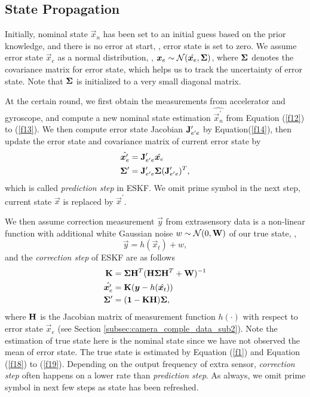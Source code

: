 \subsection{State Propagation}
\label{subsec:ESKF_IMU_sub4}

Initially, nominal state $\vec{x}_n$ has been set to an initial guess based on the prior knowledge, and there is no error at start, \ie, error state is set to zero. We assume error state $\vec{x}_e$ as a normal distribution, \ie, $\boldsymbol{x}_e \sim \mathcal{N}(\hat{\boldsymbol{x}_e}, \mathbf{\Sigma})$, where $\mathbf{\Sigma}$ denotes the covariance matrix for error state, which helps us to track the uncertainty of error state. Note that $\mathbf{\Sigma}$ is initialized to a very small diagonal matrix.

At the certain round, we first obtain the measurements from accelerator and gyroscope, and compute a new nominal state estimation $\hat{\vec{x}_n^\prime}$ from Equation (\ref{f12}) to (\ref{f13}). We then compute error state Jacobian $\mathbf{J}_{e^\prime e}^\prime$ by Equation(\ref{f14}), then update the error state and covariance matrix of current error state by
\begin{align} \label{f22}
\hat{\boldsymbol{x}_e^\prime} &= \mathbf{J}_{e^\prime e}^\prime\hat{\boldsymbol{x}_e} \\
\mathbf{\Sigma}^\prime &= \mathbf{J}_{e^\prime e}^\prime \mathbf{\Sigma} (\mathbf{J}_{e^\prime e}^\prime)^T,
\end{align}
which is called \textit{prediction step} in ESKF. We omit prime symbol in the next step, \ie current state $\vec{x}$ is replaced by $\vec{x}^\prime$.

We then assume correction measurement $\vec{y}$ from extrasensory data is a non-linear function with additional white Gaussian noise $w \sim \mathcal{N}(0, \mathbf{W})$ of our true state, \ie,
\begin{equation}\label{f17}
	\vec{y} = h(\vec{x}_t) + w,
\end{equation}
and the \textit{correction step} of ESKF are as follows
\begin{align}\label{f30}
	\mathbf{K} &= \mathbf{\Sigma}\mathbf{H}^T(\mathbf{H}\mathbf{\Sigma}\mathbf{H}^T+\mathbf{W})^{-1} \\
	\hat{\boldsymbol{x}_e^\prime} &= \mathbf{K} (\boldsymbol{y} - h(\hat{\boldsymbol{x}_t})) \\
	\mathbf{\Sigma}^\prime &= (\mathbf{1} - \mathbf{K}\mathbf{H})\mathbf{\Sigma},
\end{align}
where $\mathbf{H}$ is the Jacobian matrix of measurement function $h(\cdot)$ with respect to error state $\vec{x}_e$ (see Section \ref{subsec:camera_comple_data_sub2}). Note the estimation of true state here is the nominal state since we have not observed the mean of error state. The true state is estimated by Equation (\ref{f1}) and Equation (\ref{f18}) to (\ref{f19}). Depending on the output frequency of extra sensor, \textit{correction step} often happens on a lower rate than \textit{prediction step}. As always, we omit prime symbol in next few steps as state has been refreshed.  

